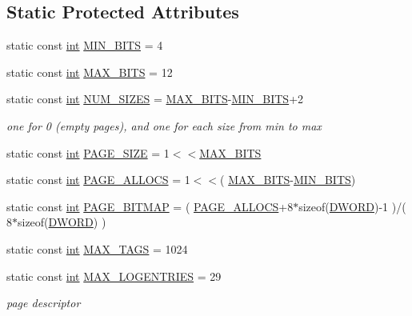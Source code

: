 \subsection*{Static Protected Attributes}
\begin{DoxyCompactItemize}
\item 
static const \hyperlink{sphinxexpr_8cpp_a4a26e8f9cb8b736e0c4cbf4d16de985e}{int} \hyperlink{classCSphArena_a70ca4983c0d42440cd92567578884315}{M\-I\-N\-\_\-\-B\-I\-T\-S} = 4
\item 
static const \hyperlink{sphinxexpr_8cpp_a4a26e8f9cb8b736e0c4cbf4d16de985e}{int} \hyperlink{classCSphArena_a0975fc2a2c2662f77dd488679c09cc65}{M\-A\-X\-\_\-\-B\-I\-T\-S} = 12
\item 
static const \hyperlink{sphinxexpr_8cpp_a4a26e8f9cb8b736e0c4cbf4d16de985e}{int} \hyperlink{classCSphArena_af8ad9554763eba18d1029743cb308543}{N\-U\-M\-\_\-\-S\-I\-Z\-E\-S} = \hyperlink{classCSphArena_a0975fc2a2c2662f77dd488679c09cc65}{M\-A\-X\-\_\-\-B\-I\-T\-S}-\/\hyperlink{classCSphArena_a70ca4983c0d42440cd92567578884315}{M\-I\-N\-\_\-\-B\-I\-T\-S}+2
\begin{DoxyCompactList}\small\item\em one for 0 (empty pages), and one for each size from min to max \end{DoxyCompactList}\item 
static const \hyperlink{sphinxexpr_8cpp_a4a26e8f9cb8b736e0c4cbf4d16de985e}{int} \hyperlink{classCSphArena_adb65db2847e9ba84de6dc19c72d568e8}{P\-A\-G\-E\-\_\-\-S\-I\-Z\-E} = 1$<$$<$\hyperlink{classCSphArena_a0975fc2a2c2662f77dd488679c09cc65}{M\-A\-X\-\_\-\-B\-I\-T\-S}
\item 
static const \hyperlink{sphinxexpr_8cpp_a4a26e8f9cb8b736e0c4cbf4d16de985e}{int} \hyperlink{classCSphArena_ac0ce1408245d49b4ebef48f333be6304}{P\-A\-G\-E\-\_\-\-A\-L\-L\-O\-C\-S} = 1$<$$<$( \hyperlink{classCSphArena_a0975fc2a2c2662f77dd488679c09cc65}{M\-A\-X\-\_\-\-B\-I\-T\-S}-\/\hyperlink{classCSphArena_a70ca4983c0d42440cd92567578884315}{M\-I\-N\-\_\-\-B\-I\-T\-S})
\item 
static const \hyperlink{sphinxexpr_8cpp_a4a26e8f9cb8b736e0c4cbf4d16de985e}{int} \hyperlink{classCSphArena_a128a5767da8610eae80c17ef00566942}{P\-A\-G\-E\-\_\-\-B\-I\-T\-M\-A\-P} = ( \hyperlink{classCSphArena_ac0ce1408245d49b4ebef48f333be6304}{P\-A\-G\-E\-\_\-\-A\-L\-L\-O\-C\-S}+8$\ast$sizeof(\hyperlink{sphinxstd_8h_a798af1e30bc65f319c1a246cecf59e39}{D\-W\-O\-R\-D})-\/1 )/( 8$\ast$sizeof(\hyperlink{sphinxstd_8h_a798af1e30bc65f319c1a246cecf59e39}{D\-W\-O\-R\-D}) )
\item 
static const \hyperlink{sphinxexpr_8cpp_a4a26e8f9cb8b736e0c4cbf4d16de985e}{int} \hyperlink{classCSphArena_af929477f4573cff8569d9d72c0564b29}{M\-A\-X\-\_\-\-T\-A\-G\-S} = 1024
\item 
static const \hyperlink{sphinxexpr_8cpp_a4a26e8f9cb8b736e0c4cbf4d16de985e}{int} \hyperlink{classCSphArena_ad48b31ee600d8eacd91501079020d30f}{M\-A\-X\-\_\-\-L\-O\-G\-E\-N\-T\-R\-I\-E\-S} = 29
\begin{DoxyCompactList}\small\item\em page descriptor \end{DoxyCompactList}\end{DoxyCompactItemize}


